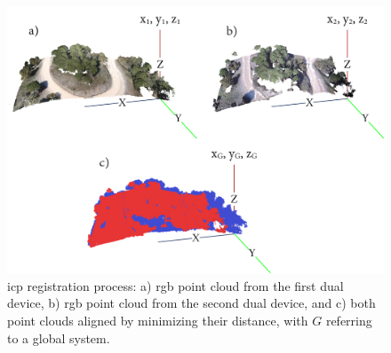 \begin{figure}[ht]
    \centering
    \includegraphics[width=\linewidth]{figs/multi_thermal_projection/ICP.png}
    \caption{\acrshort{icp} registration process: a) \acrshort{rgb} point cloud from the first dual device, b) \acrshort{rgb} point cloud from the second dual device, and c) both point clouds aligned by minimizing their distance, with $G$ referring to a global system.}
    \label{fig:icp}
\end{figure}

